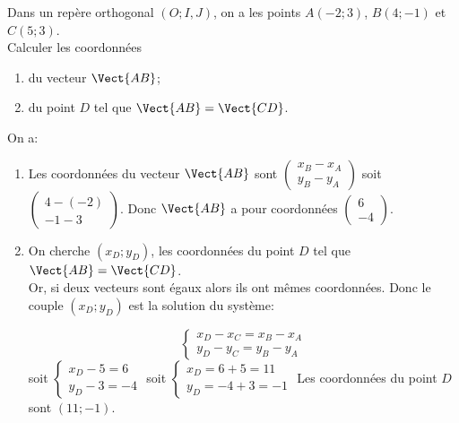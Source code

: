 \documentclass{book}
\begin{document}
\begin{Methode}
 Dans un repère orthogonal $(O;I,J)$, on a les points $A(-2;3)$, $B(4;-1)$ et $C(5;3)$. \\Calculer les coordonnées 
 \begin{enumerate}
  \item du vecteur $\Vect{AB}$;
  \item du point $D$ tel que $\Vect{AB}=\Vect{CD}$.
 \end{enumerate}
On a:
 \begin{enumerate}
  \item Les coordonnées du  vecteur $\Vect{AB}$ sont 
$\left( \begin{array}{c}
                    x_B-x_A \\ y_B-y_A
                   \end{array}
\right)$ soit $\left( \begin{array}{c}
                    4-(-2) \\ -1-3
                   \end{array}
\right)$.
Donc $\Vect{AB}$ a pour coordonnées $\left( \begin{array}{c}
                    6 \\ -4
                   \end{array}
\right)$.

\item On cherche $(x_D;y_D)$, les coordonnées du 
point $D$ tel que $\Vect{AB}=\Vect{CD}$.\\ 
Or,  si deux vecteurs sont égaux alors ils ont mêmes coordonnées. 
Donc le couple $(x_D;y_D)$ est la solution du système: 


$$\left\lbrace \begin{array}{c}
                    x_D-x_C=x_B-x_A \\ y_D-y_C=y_B-y_A
                   \end{array}\right.$$
soit  $\left \lbrace \begin{array}{l}
                                                        x_D-5=6 \\y_D-3=-4
                                                       \end{array}
\right.$
soit  $\left \lbrace \begin{array}{l}
                                                        x_D=6+5=11 \\y_D=-4+3=-1
                                                       \end{array}
\right.$
Les coordonnées du point $D$ sont $(11;-1)$.
 \end{enumerate}
\end{Methode}
\end{document}
